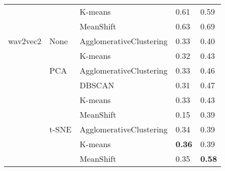 \begin{tabular}{lllll}
         &      & K-means &  0.61 &      0.59 \\
         &      & MeanShift &  0.63 &      0.69 \\
\midrule
wav2vec2 & None & AgglomerativeClustering &  0.33 &      0.40 \\
         &      & K-means &  0.32 &      0.43 \\
         & PCA & AgglomerativeClustering &  0.33 &      0.46 \\
         &      & DBSCAN &  0.31 &      0.47 \\
         &      & K-means &  0.33 &      0.43 \\
         &      & MeanShift &  0.15 &      0.39 \\
         & t-SNE & AgglomerativeClustering &  0.34 &      0.39 \\
         &      & K-means &  \textbf{0.36} &      0.39 \\
         &      & MeanShift &  0.35 &      \textbf{0.58} \\
\bottomrule
\end{tabular}
